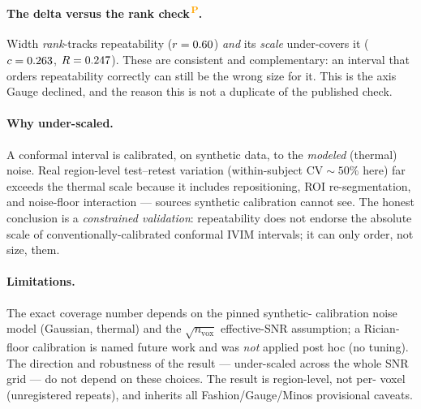 \documentclass[11pt]{article}
\newcommand{\PROV}{\textsuperscript{\textcolor{orange}{\,P}}}
\begin{document}
\paragraph{The delta versus the rank check\PROV{}.} Width \emph{rank}-tracks repeatability
($r=0.60$) \emph{and} its \emph{scale} under-covers it ($c=0.263$, $R=0.247$).
These are consistent and complementary: an interval that orders repeatability correctly can
still be the wrong size for it. This is the axis Gauge declined, and the reason this is not
a duplicate of the published check.

\paragraph{Why under-scaled.} A conformal interval is calibrated, on synthetic data, to the
\emph{modeled} (thermal) noise. Real region-level test--retest variation (within-subject
$\mathrm{CV}\sim 50\%$ here) far exceeds the thermal scale because it includes repositioning,
ROI re-segmentation, and noise-floor interaction --- sources synthetic calibration cannot
see. The honest conclusion is a \emph{constrained validation}: repeatability does not
endorse the absolute scale of conventionally-calibrated conformal IVIM intervals; it can
only order, not size, them.

\paragraph{Limitations.} The exact coverage number depends on the pinned synthetic-
calibration noise model (Gaussian, thermal) and the $\sqrt{n_{\mathrm{vox}}}$ effective-SNR
assumption; a Rician-floor calibration is named future work and was \emph{not} applied post
hoc (no tuning). The direction and robustness of the result --- under-scaled across the
whole SNR grid --- do not depend on these choices. The result is region-level, not per-
voxel (unregistered repeats), and inherits all Fashion/Gauge/Minos provisional caveats.
\end{document}
